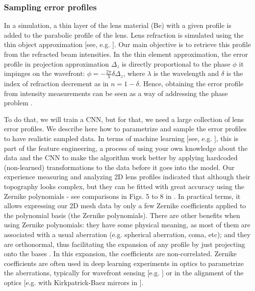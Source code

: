 \documentclass[preprint]{iucr}
\newcommand{\inred}[1]{{\color{red}#1}}
\begin{document}
\subsubsection{Sampling error profiles}
In a simulation, a thin layer of the lens material (Be) with a given profile is added to the parabolic profile of the lens. Lens refraction is simulated using the thin object approximation [see, e.g. \cite{Celestre2020, multioptics}]. Our main objective is to retrieve this profile from the refracted beam intensities. \inred{In the thin element approximation, the error profile in projection approximation $\Delta_z$ is directly proportional to the phase $\phi$ it impinges on the wavefront: $\phi = - \frac{2\pi}{\lambda} \delta \Delta_z$, where $\lambda$ is the wavelength and $\delta$ is the index of refraction decrement as in $n=1-\delta$. Hence, obtaining the error profile from intensity measurements can be seen as a way of addressing the phase problem \cite{Taylor1981,Klibanov1995}.}

To do that, we will train a CNN, but for that, we need a large collection of lens error profiles. We describe here how to parametrize and sample the error profiles to have realistic sampled data. In terms of machine learning [see, e.g. \cite{chollet_book}], this is part of the feature engineering, a process of using your own knowledge about the data and the CNN to make the algorithm work better by applying hardcoded (non-learned) transformations to the data before it goes into the model.
Our experience measuring and analyzing 2D lens profiles indicated that although their topography looks complex, but they can be fitted with great accuracy using the Zernike polynomials \inred{- see comparisons in Figs. 5 to 8 in \cite{Celestre2020}}. In practical terms, it allows expressing our 2D mesh data by only a few Zernike coefficients applied to the polynomial basis (the Zernike polynomials). There are other benefits when using Zernike polynomials: they have some physical meaning, as most of them are associated with a usual aberration (e.g. spherical aberration, coma, etc); and they are orthonormal, thus facilitating the expansion of any profile by just projecting onto the bases \inred{\cite{Mahajan2011}}. In this expansion, the coefficients are non-correlated. Zernike coefficients are often used in deep learning experiments in optics to parametrize the aberrations, typically for wavefront sensing [e.g. \cite{Saha2020}] or in the alignment of the optics [e.g. with Kirkpatrick-Baez mirrors in \cite{Luiz2022}]. 
\end{document}
